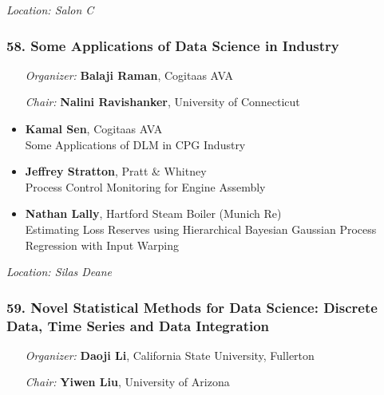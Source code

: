 \emph{Location: Salon C}

\subsubsection*{58. Some Applications of Data Science in Industry}

\begin{enumerate}[align=left]
\item [\emph{Organizer:}] \textbf{Balaji Raman}, Cogitaas AVA
\item [\emph{Chair:}] \textbf{Nalini Ravishanker},  University of Connecticut
\end{enumerate}

\begin{itemize}
\item \textbf{Kamal Sen}, Cogitaas AVA \\
Some Applications of DLM in CPG Industry
\item \textbf{Jeffrey Stratton}, Pratt \& Whitney \\
Process Control Monitoring for Engine Assembly
\item \textbf{Nathan Lally}, Hartford Steam Boiler (Munich Re) \\
Estimating Loss Reserves using Hierarchical Bayesian Gaussian Process Regression with Input Warping
\end{itemize}

\emph{Location: Silas Deane}

\subsubsection*{59. Novel Statistical Methods for Data Science: Discrete Data, Time Series and Data Integration}

\begin{enumerate}[align=left]
\item [\emph{Organizer:}] \textbf{Daoji Li}, California State University, Fullerton
\item [\emph{Chair:}] \textbf{Yiwen Liu},  University of Arizona
\end{enumerate}

